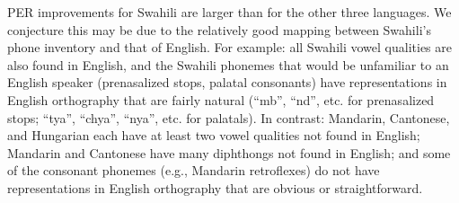 PER improvements for Swahili are larger than for the other three
languages. %
We conjecture this may be due to the relatively good mapping between
Swahili's phone inventory and that of English. For example: all Swahili
vowel qualities are also found in English, and the Swahili phonemes 
that would be unfamiliar to an English speaker (prenasalized stops, 
palatal consonants) have representations in English orthography that are 
fairly natural (``mb'', ``nd'', etc. for prenasalized stops; ``tya'', 
``chya'', ``nya'', etc. for palatals). In contrast: Mandarin, 
Cantonese, and Hungarian each have at least two vowel qualities not 
found in English; Mandarin and 
Cantonese have many diphthongs not found in English; and some of the 
consonant phonemes (e.g., Mandarin retroflexes) do not have 
representations in English orthography that are obvious or 
straightforward. %


